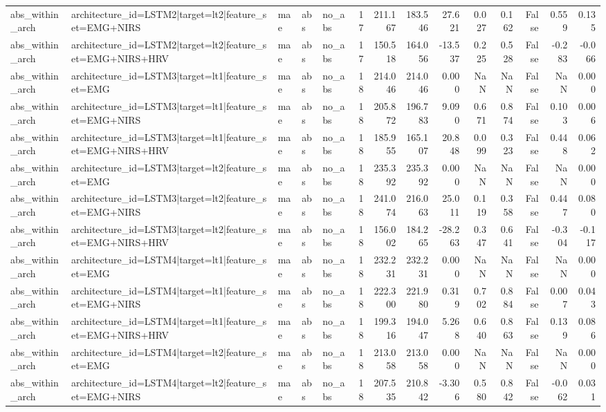 \begin{table}
\begin{tabular}{lllllrrrrrrrrr}
abs_within_arch & architecture_id=LSTM2|target=lt2|feature_set=EMG+NIRS & mae & abs & no_abs & 17 & 211.167 & 183.546 & 27.621 & 0.027 & 0.162 & False & 0.559 & 0.135 \\
abs_within_arch & architecture_id=LSTM2|target=lt2|feature_set=EMG+NIRS+HRV & mae & abs & no_abs & 17 & 150.518 & 164.056 & -13.537 & 0.225 & 0.528 & False & -0.283 & -0.066 \\
abs_within_arch & architecture_id=LSTM3|target=lt1|feature_set=EMG & mae & abs & no_abs & 18 & 214.046 & 214.046 & 0.000 & NaN & NaN & False & NaN & 0.000 \\
abs_within_arch & architecture_id=LSTM3|target=lt1|feature_set=EMG+NIRS & mae & abs & no_abs & 18 & 205.872 & 196.783 & 9.090 & 0.671 & 0.874 & False & 0.103 & 0.006 \\
abs_within_arch & architecture_id=LSTM3|target=lt1|feature_set=EMG+NIRS+HRV & mae & abs & no_abs & 18 & 185.955 & 165.107 & 20.848 & 0.099 & 0.323 & False & 0.448 & 0.062 \\
abs_within_arch & architecture_id=LSTM3|target=lt2|feature_set=EMG & mae & abs & no_abs & 18 & 235.392 & 235.392 & 0.000 & NaN & NaN & False & NaN & 0.000 \\
abs_within_arch & architecture_id=LSTM3|target=lt2|feature_set=EMG+NIRS & mae & abs & no_abs & 18 & 241.074 & 216.063 & 25.011 & 0.119 & 0.358 & False & 0.447 & 0.080 \\
abs_within_arch & architecture_id=LSTM3|target=lt2|feature_set=EMG+NIRS+HRV & mae & abs & no_abs & 18 & 156.002 & 184.265 & -28.263 & 0.347 & 0.641 & False & -0.304 & -0.117 \\
abs_within_arch & architecture_id=LSTM4|target=lt1|feature_set=EMG & mae & abs & no_abs & 18 & 232.231 & 232.231 & 0.000 & NaN & NaN & False & NaN & 0.000 \\
abs_within_arch & architecture_id=LSTM4|target=lt1|feature_set=EMG+NIRS & mae & abs & no_abs & 18 & 222.300 & 221.980 & 0.319 & 0.702 & 0.884 & False & 0.007 & 0.043 \\
abs_within_arch & architecture_id=LSTM4|target=lt1|feature_set=EMG+NIRS+HRV & mae & abs & no_abs & 18 & 199.316 & 194.047 & 5.268 & 0.640 & 0.863 & False & 0.139 & 0.086 \\
abs_within_arch & architecture_id=LSTM4|target=lt2|feature_set=EMG & mae & abs & no_abs & 18 & 213.058 & 213.058 & 0.000 & NaN & NaN & False & NaN & 0.000 \\
abs_within_arch & architecture_id=LSTM4|target=lt2|feature_set=EMG+NIRS & mae & abs & no_abs & 18 & 207.535 & 210.842 & -3.306 & 0.580 & 0.842 & False & -0.062 & 0.031 \\

\end{tabular}
\end{table}
